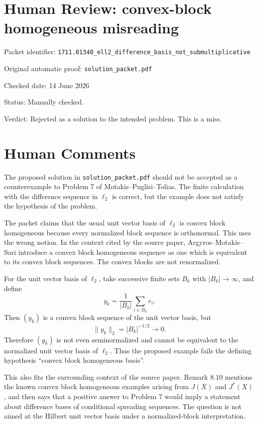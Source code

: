 \documentclass[11pt]{article}
\begin{document}
\section*{Human Review: convex-block homogeneous misreading}

\noindent Packet identifier:
\texttt{1711.01340\_ell2\_difference\_basis\_not\_submultiplicative}

\noindent Original automatic proof: \texttt{solution\_packet.pdf}

\noindent Checked date: 14 June 2026

\noindent Status: Manually checked.

\noindent Verdict: Rejected as a solution to the intended problem.  This is a
miss.

\section*{Human Comments}

The proposed solution in \texttt{solution\_packet.pdf} should not be accepted
as a counterexample to Problem 7 of Motakis--Puglisi--Tolias.  The finite
calculation with the difference sequence in \(\ell_2\) is correct, but the
example does not satisfy the hypothesis of the problem.

The packet claims that the usual unit vector basis of \(\ell_2\) is convex
block homogeneous because every normalized block sequence is orthonormal.
This uses the wrong notion.  In the context cited by the source paper,
Argyros--Motakis--Sari introduce a convex block homogeneous sequence as one
which is equivalent to its convex block sequences.  The convex blocks are not
renormalized.

For the unit vector basis of \(\ell_2\), take successive finite sets \(B_k\)
with \(|B_k|\to\infty\), and define
\[
  y_k=\frac{1}{|B_k|}\sum_{i\in B_k} e_i .
\]
Then \((y_k)\) is a convex block sequence of the unit vector basis, but
\[
  \|y_k\|_2=|B_k|^{-1/2}\longrightarrow 0.
\]
Therefore \((y_k)\) is not even seminormalized and cannot be equivalent to the
normalized unit vector basis of \(\ell_2\).  Thus the proposed example fails
the defining hypothesis ``convex block homogeneous basis''.

This also fits the surrounding context of the source paper.  Remark 8.10
mentions the known convex block homogeneous examples arising from \(J(X)\) and
\(J^*(X)\), and then says that a positive answer to Problem 7 would imply a
statement about difference bases of conditional spreading sequences.  The
question is not aimed at the Hilbert unit vector basis under a normalized-block
interpretation.
\end{document}

